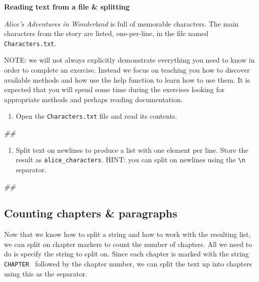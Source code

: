 \documentclass[]{book}
\newenvironment{Shaded}{\begin{snugshade}}{\end{snugshade}}
\newcommand{\CommentTok}[1]{\textcolor[rgb]{0.56,0.35,0.01}{\textit{#1}}}
\providecommand{\tightlist}{%
  \setlength{\itemsep}{0pt}\setlength{\parskip}{0pt}}
\begin{document}
\textbf{Reading text from a file \& splitting}

\emph{Alice's Adventures in Wonderland} is full of memorable characters. The main characters from the story are listed, one-per-line, in the file named \texttt{Characters.txt}.

NOTE: we will not always explicitly demonstrate everything you need to know in order to complete an exercise. Instead we focus on teaching you how to discover available methods and how use the help function to learn how to use them. It is expected that you will spend some time during the exercises looking for appropriate methods and perhaps reading documentation.

\begin{enumerate}
\def\labelenumi{\arabic{enumi}.}
\tightlist
\item
  Open the \texttt{Characters.txt} file and read its contents.
\end{enumerate}

\begin{Shaded}
\begin{Highlighting}[]
\CommentTok{##}
\end{Highlighting}
\end{Shaded}

\begin{enumerate}
\def\labelenumi{\arabic{enumi}.}
\setcounter{enumi}{1}
\tightlist
\item
  Split text on newlines to produce a list with one element per line. Store the result as \texttt{alice\_characters}. HINT: you can split on newlines using the \texttt{\textbackslash{}n} separator.
\end{enumerate}

\begin{Shaded}
\begin{Highlighting}[]
\CommentTok{##}
\end{Highlighting}
\end{Shaded}

\hypertarget{counting-chapters-paragraphs}{%
\subsection{Counting chapters \& paragraphs}\label{counting-chapters-paragraphs}}

Now that we know how to split a string and how to work with the resulting list, we can split on chapter markers to count the number of chapters. All we need to do is specify the string to split on. Since each chapter is marked with the string \texttt{\textquotesingle{}CHAPTER\ \textquotesingle{}} followed by the chapter number, we can split the text up into chapters using this as the separator.
\end{document}
